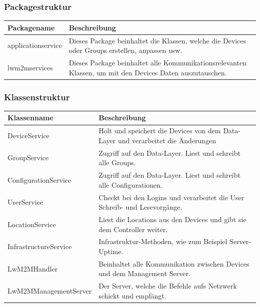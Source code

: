 \subsubsection{Packagestruktur}

\begin{table}[H]
\centering
    \begin{tabular}{@{}l p{14.1cm} @{}}\toprule    
    {Packagename} & {Beschreibung}\\ \midrule
    applicationservice & Dieses Package beinhaltet die Klassen, welche die Devices oder Groups erstellen, anpassen usw. \\       
    lwm2mservices & Dieses Package beinhaltet alle Kommunikationsrelevanten Klassen, um mit den Devices Daten auszutauschen. \\
    \bottomrule
    \end{tabular}
\end{table}

\subsubsection{Klassenstruktur}
\begin{table}[H]
\centering
    \begin{tabular}{@{}l p{14.1cm} @{}}\toprule    
    {Klassenname} & {Beschreibung}\\ \midrule
     DeviceService & Holt und speichert die Devices von dem Data-Layer und verarbeitet die Änderungen  \\       
     GroupService & Zugriff auf den Data-Layer. Liest und schreibt alle Groups.  \\       
     ConfigurationService & Zugriff auf den Data-Layer. Liest und schreibt alle Configurationen.  \\  
     UserService & Checkt bei den Logins und verarbeitet die User Schreib- und Lesevorgänge.  \\            
     LocationService & Liest die Locations aus den Devices und gibt sie dem Controller weiter.  \\       
     InfrastructureService & Infrastruktur-Methoden, wie zum Beispiel Server-Uptime.  \\       
     LwM2MHandler & Beinhaltet alle Kommunikation zwischen Devices und dem Management Server.  \\       
     LwM2MManagementServer & Der Server, welche die Befehle aufs Netzwerk schickt und empfängt.  \\       
    \bottomrule
    \end{tabular}
\end{table}
